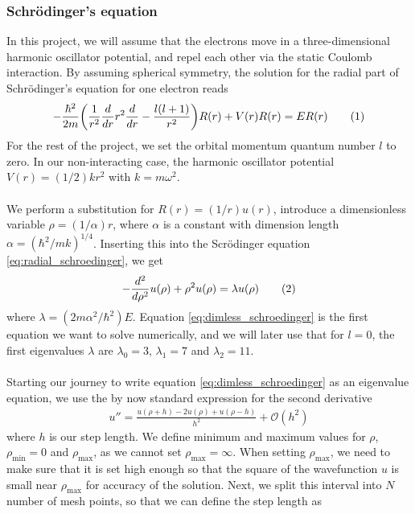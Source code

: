 \documentclass{article}
\newcommand\numberthis{\addtocounter{equation}{1}\tag{\theequation}}
\begin{document}
\subsubsection{Schrödinger's equation}
In this project, we will assume that the electrons move in a three-dimensional harmonic oscillator potential, and repel each other via the static Coulomb interaction. By assuming spherical symmetry, the solution for the radial part of Schrödinger's equation for one electron reads
\begin{align*}
  -\frac{\hbar^2}{2m}\bigg(\frac{1}{r^2}\frac{d}{dr}r^2\frac{d}{dr} - \frac{l(l+1)}{r^2}\bigg)R(r) + V(r)R(r) = ER(r)\numberthis\label{eq:radial_schroedinger}
\end{align*}
For the rest of the project, we set the orbital momentum quantum number $l$ to zero. In our non-interacting case, the harmonic oscillator potential $V(r) = (1/2)kr^2$ with $k=m\omega^2$.\\\\We perform a substitution for $R(r) = (1/r)u(r)$, introduce a dimensionless variable $\rho = (1/\alpha)r$, where $\alpha$ is a constant with dimension length $\alpha = (\hbar^2/mk)^{1/4}$. Inserting this into the Scrödinger equation \eqref{eq:radial_schroedinger}, we get
\begin{align*}
-\frac{d^2}{d\rho^2}u(\rho) + \rho^2u(\rho) = \lambda u(\rho)\numberthis\label{eq:dimless_schroedinger}
\end{align*}
where $\lambda = (2m\alpha^2/\hbar^2)E$. Equation \eqref{eq:dimless_schroedinger} is the first equation we want to solve numerically, and we will later use that for $l=0$, the first eigenvalues $\lambda$ are $\lambda_0 = 3$, $\lambda_1 = 7$ and $\lambda_2 = 11$.\\\\
Starting our journey to write equation \eqref{eq:dimless_schroedinger} as an eigenvalue equation, we use the by now standard expression for the second derivative
\begin{align*}
  u'' = \frac{u(\rho+h)-2u(\rho)+u(\rho-h)}{h^2}+\mathcal{O}(h^2)
\end{align*}
where $h$ is our step length. We define minimum and maximum values for $\rho$, $\rho_{\text{min}} = 0$ and $\rho_{\text{max}}$, as we cannot set $\rho_{\text{max}} = \infty$. When setting $\rho_{\text{max}}$, we need to make sure that it is set high enough so that the square of the wavefunction $u$ is small near $\rho_{\text{max}}$ for accuracy of the solution. Next, we split this interval into $N$ number of mesh points, so that we can define the step length as
\end{document}
